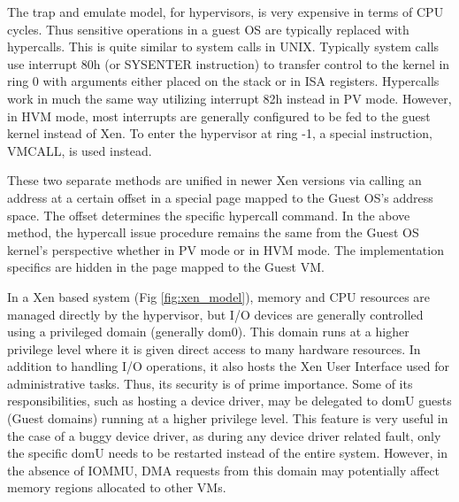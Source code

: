 The trap and emulate model, for hypervisors, is very expensive in terms of CPU cycles. Thus sensitive operations in a guest OS are typically replaced with hypercalls. This is quite similar to system calls in UNIX. Typically system calls use interrupt 80h (or SYSENTER instruction) to transfer control to the kernel in ring 0 with arguments either placed on the stack or in ISA registers. Hypercalls work in much the same way utilizing interrupt 82h instead in PV mode. However, in HVM mode, most interrupts are generally configured to be fed to the guest kernel instead of Xen. To enter the hypervisor at ring -1, a special instruction, VMCALL, is used instead.

These two separate methods are unified in newer Xen versions via calling an address at a certain offset in a special page mapped to the Guest OS's address space. The offset determines the specific hypercall command. In the above method, the hypercall issue procedure remains the same from the Guest OS kernel's perspective whether in PV mode or in HVM mode. The implementation specifics are hidden in the page mapped to the Guest VM.

In a Xen based system (Fig \ref{fig:xen_model}), memory and CPU resources are managed directly by the hypervisor, but I/O devices are generally controlled using a privileged domain (generally dom0). This domain runs at a higher privilege level where it is given direct access to many hardware resources. In addition to handling I/O operations, it also hosts the Xen User Interface used for administrative tasks. Thus, its security is of prime importance. Some of its responsibilities, such as hosting a device driver, may be delegated to domU guests (Guest domains) running at a higher privilege level. This feature is very useful in the case of a buggy device driver, as during any device driver related fault, only the specific domU needs to be restarted instead of the entire system. However, in the absence of IOMMU, DMA requests from this domain may potentially affect memory regions allocated to other VMs. 

